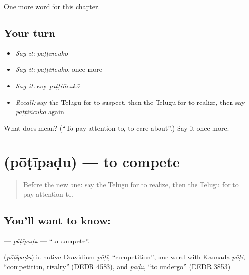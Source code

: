 \begin{grammarlens}[title={What you've built}]
One more word for this chapter.
\end{grammarlens}

\subsection*{Your turn}
\begin{itemize}
\raggedright
  \item \emph{Say it:} \emph{paṭṭiñcukō}
  \item \emph{Say it:} \emph{paṭṭiñcukō}, once more
  \item \emph{Say it:} say \emph{paṭṭiñcukō}
  \item \emph{Recall:} say the Telugu for to suspect, then the Telugu for to realize, then say \emph{paṭṭiñcukō} again
\end{itemize}

\begin{tcolorbox}[breakable,colback=teal!4,colframe=teal!35!black,title={Before you move on}]
What does  mean? (\textquotedblleft{}To pay attention to, to care about\textquotedblright{}.) Say it once more.
\end{tcolorbox}
\section[\texorpdfstring{\te{పోటీపడు} (pōṭīpaḍu)}{పోటీపడు (pōṭīpaḍu)}]{ (pōṭīpaḍu) — to compete}

\label{lesson:TE-C163-potipadu}



\begin{quote}
Before the new one: say the Telugu for to realize, then the Telugu for to pay attention to.
\end{quote}

\subsection*{You'll want to know: }
\textbf{} — \emph{pōṭīpaḍu} — \textquotedblleft{}to compete\textquotedblright{}.

\begin{cousinweb}
\textbf{} (\emph{pōṭīpaḍu}) is native Dravidian: \emph{pōṭī}, \textquotedblleft{}competition\textquotedblright{}, one word with Kannada \emph{pōṭi}, \textquotedblleft{}competition, rivalry\textquotedblright{} (DEDR 4583), and \emph{paḍu}, \textquotedblleft{}to undergo\textquotedblright{} (DEDR 3853).
\end{cousinweb}

